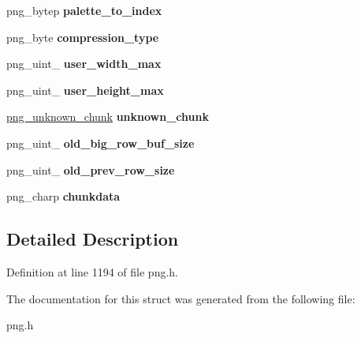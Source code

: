 \begin{DoxyCompactItemize}
\item 
\hypertarget{structpng__struct__def_a121ff8f9b7a1077bb7e45a8ebabedf26}{png\+\_\+bytep {\bfseries palette\+\_\+to\+\_\+index}}\label{structpng__struct__def_a121ff8f9b7a1077bb7e45a8ebabedf26}

\item 
\hypertarget{structpng__struct__def_ad448c2648c447212ff66a0ec48cf1394}{png\+\_\+byte {\bfseries compression\+\_\+type}}\label{structpng__struct__def_ad448c2648c447212ff66a0ec48cf1394}

\item 
\hypertarget{structpng__struct__def_ae2c8e28ab4ed28530dd449d1d49a5c22}{png\+\_\+uint\+\_ {\bfseries user\+\_\+width\+\_\+max}}\label{structpng__struct__def_ae2c8e28ab4ed28530dd449d1d49a5c22}

\item 
\hypertarget{structpng__struct__def_a97ba7921e886a8ca2c28891da3cf9213}{png\+\_\+uint\+\_ {\bfseries user\+\_\+height\+\_\+max}}\label{structpng__struct__def_a97ba7921e886a8ca2c28891da3cf9213}

\item 
\hypertarget{structpng__struct__def_ae2e0bf232263efa8844922d2667f0df4}{\hyperlink{structpng__unknown__chunk__t}{png\+\_\+unknown\+\_\+chunk} {\bfseries unknown\+\_\+chunk}}\label{structpng__struct__def_ae2e0bf232263efa8844922d2667f0df4}

\item 
\hypertarget{structpng__struct__def_a6bf7d1b78838b36a1d17946831fd754d}{png\+\_\+uint\+\_ {\bfseries old\+\_\+big\+\_\+row\+\_\+buf\+\_\+size}}\label{structpng__struct__def_a6bf7d1b78838b36a1d17946831fd754d}

\item 
\hypertarget{structpng__struct__def_ab7dce2e46e7dbb49f91f70a1b03b31ed}{png\+\_\+uint\+\_ {\bfseries old\+\_\+prev\+\_\+row\+\_\+size}}\label{structpng__struct__def_ab7dce2e46e7dbb49f91f70a1b03b31ed}

\item 
\hypertarget{structpng__struct__def_a1afe0fa7e215dc2ee41afad5f1603893}{png\+\_\+charp {\bfseries chunkdata}}\label{structpng__struct__def_a1afe0fa7e215dc2ee41afad5f1603893}

\end{DoxyCompactItemize}


\subsection{Detailed Description}


Definition at line 1194 of file png.\+h.



The documentation for this struct was generated from the following file\+:\begin{DoxyCompactItemize}
\item 
png.\+h\end{DoxyCompactItemize}
